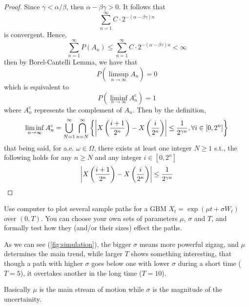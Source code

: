 \begin{subproblem}
        \item
        \begin{proof}
            Since $\gamma<\alpha/\beta$, then $\alpha-\beta\gamma>0$.
            It follows that
            \[\sum_{n=1}^\infty C\cdot 2^{-(\alpha-\beta\gamma)n}\]
            is convergent. Hence,
            \[\sum_{n=1}^\infty P(A_n)
            \leq\sum_{n=1}^\infty C\cdot 2^{-(\alpha-\beta\gamma)n}
            <\infty\]
            then by Borel-Cantelli Lemma, we have that
            \[P\left(\limsup_{n\to\infty}A_n\right)=0\]
            which is equivalent to
            \[P\left(\liminf_{n\to\infty}A_n^\mathrm c\right)=1\]
            where $A_n^\mathrm c$ represents the complement of $A_n$.
            Then by the definition,
            \[\liminf_{n\to\infty}A_n^\mathrm c
            =\bigcup_{N=1}^\infty\bigcap_{n=N}^\infty
            \left\{\left|X\left(\frac{i+1}{2^n}\right)-X\left(\frac{i}{2^n}\right)\right|\leq\frac{1}{2^{\gamma n}}
            ,\forall i\in[0,2^n]\right\}\]
            that being said, for a.e. $\omega\in\Omega$,
            there exists at least one integer $N\geq 1$ s.t.,
            the following holds for any $n\geq N$ and any integer
            $i\in [0,2^n]$
            \[\left|X\left(\frac{i+1}{2^n}\right)-X\left(\frac{i}{2^n}\right)\right|\leq\frac{1}{2^{\gamma n}}\]
        \end{proof}
    \end{subproblem}

    \problem
    \begin{question}
        Use computer to plot several sample paths for a GBM
        $X_t=\exp(\mu t+\sigma W_t)$ over $(0,T)$. 
        You can choose your own sets of parameters $\mu$,
        $\sigma$ and $T$, and formally test how they (and/or their sizes) effect the paths.
    \end{question}
    As we can see (\cref{fig:simulation}), the bigger $\sigma$ means more
    powerful zigzag, and $\mu$ determines the main trend,
    while larger $T$ shows something interesting, that though
    a path with higher $\sigma$ goes below one with lower
    $\sigma$ during a short time ($T=5$),
    it overtakes another in the long time ($T=10$).

    Basically $\mu$ is the main stream of motion while
    $\sigma$ is the magnitude of the uncertainity.

